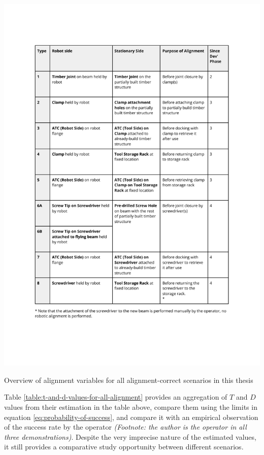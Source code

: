 \begin{table}
    \includegraphics[page=7, trim=25.4mm 40mm 14mm 33mm, clip, width=\textwidth]{tables/Tables in Chapter 9 to 11.pdf}
    \caption{Overview of alignment variables for all alignment-correct scenarios in this thesis}
    \label{table:overview-of-alignment-variables-for-all-alignment}
\end{table}

Table \ref{table:t-and-d-values-for-all-alignment} provides an aggregation of $T$ and $D$ values from their estimation in the table above, compare them using the limits in equation \ref{eq:probability-of-success}, and compare it with an empirical observation of the success rate by the operator \textit{(Footnote: the author is the operator in all three demonstrations)}. Despite the very imprecise nature of the estimated values, it still provides a comparative study opportunity between different scenarios.

